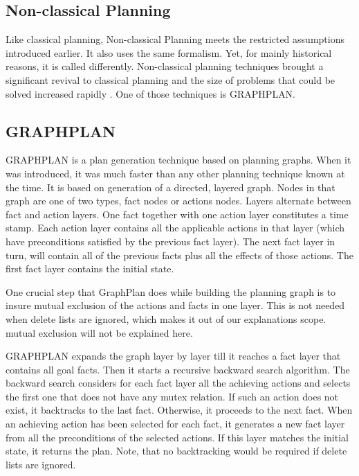 \documentclass
[a4paper
,english
,parskip=half
,bibliography=totoc
]{scrreprt}
\begin{document}
        \subsection{Non-classical Planning}
        Like classical planning, Non-classical Planning meets the restricted assumptions introduced earlier. It also uses the same formalism. Yet, for mainly historical reasons, it is called differently. Non-classical planning techniques brought a significant revival to classical planning and the size of problems that could be solved increased rapidly \citep{automated_planning}.  One of those techniques is GRAPHPLAN. 
        
        \subsection{GRAPHPLAN}
        GRAPHPLAN is a plan generation technique \citep{Blum:1997:FPT:249379.249386} based on planning graphs. When it was introduced, it was much faster than any other planning technique known at the time. It is based on generation of a directed, layered graph. Nodes in that graph are one of two types, fact nodes or actions nodes. Layers alternate between fact and action layers. One fact together with one action layer constitutes a time stamp. Each action layer contains all the applicable actions in that layer (which have preconditions satisfied by the previous fact layer). The next fact layer in turn, will contain all of the previous facts plus all the effects of those actions. The first fact layer contains the initial state.

        One crucial step that GraphPlan does while building the planning graph is to insure mutual exclusion of the actions and facts in one layer. This is not needed when delete lists are ignored, which makes it out of our explanations scope. mutual exclusion will not be explained here.

        GRAPHPLAN expands the graph layer by layer till it reaches a fact layer that contains all goal facts. Then it starts a recursive backward search algorithm. The backward search considers for each fact layer all the achieving actions and selects the first one that does not have any mutex relation. If such an action does not exist, it backtracks to the last fact. Otherwise, it proceeds to the next fact. When an achieving action has been selected for each fact, it generates a new fact layer from all the preconditions of the selected actions. If this layer matches the initial state, it returns the plan. Note, that no backtracking would be required if delete lists are ignored.
        
\end{document}

